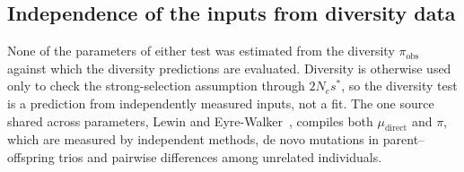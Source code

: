 \documentclass{article}
\begin{document}
\subsection{Independence of the inputs from diversity data}\label{sec:independence_methods}
None of the parameters of either test was estimated from the diversity $\pi_\text{obs}$ against which the diversity predictions are evaluated. Diversity is otherwise used only to check the strong-selection assumption through $2N_es^*$, so the diversity test is a prediction from independently measured inputs, not a fit. The one source shared across parameters, Lewin and Eyre-Walker~\cite{lewin2026}, compiles both $\mu_\text{direct}$ and $\pi$, which are measured by independent methods, de novo mutations in parent--offspring trios and pairwise differences among unrelated individuals.

\ifdefined\isMainDocument
\else
    \printbibliography
    
\end{document}
